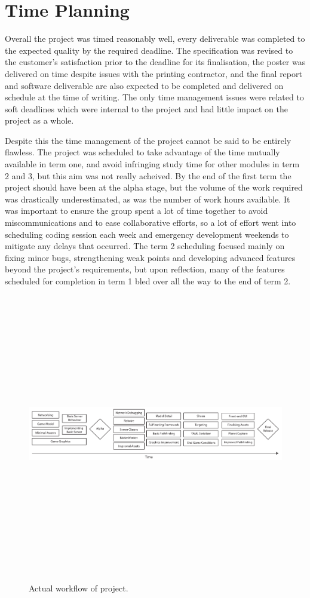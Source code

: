 \section{Time Planning}

Overall the project was timed reasonably well, every deliverable was completed to the expected quality by the required deadline. The specification was revised to the customer's satisfaction prior to the deadline for its finalisation, the poster was delivered on time despite issues with the printing contractor, and the final report and software deliverable are also expected to be completed and delivered on schedule at the time of writing. The only time management issues were related to soft deadlines which were internal to the project and had little impact on the project as a whole.

Despite this the time management of the project cannot be said to be entirely flawless.
The project was scheduled to take advantage of the time mutually available in term one, and avoid infringing study time for other modules in term 2 and 3, but this aim was not really acheived. 
By the end of the first term the project should have been at the alpha stage, but the volume of the work required was drastically underestimated, as was the number of work hours available. It was important to ensure the group spent a lot of time together to avoid miscommunications and to ease collaborative efforts, so a lot of effort went into scheduling coding session each week and emergency development weekends to mitigate any delays that occurred. The term 2 scheduling focused mainly on fixing minor bugs, strengthening weak points and developing advanced features beyond the project's requirements, but upon reflection, many of the features scheduled for completion in term 1 bled over all the way to the end of term 2. 

\begin{figure}
	\includegraphics[height=33em]{res/pm/actual_workflow_diagram}
	\label{fig:actual_workflow_diagram}
	\caption[Actual workflow of project]{Actual workflow of project.}
\end{figure}

